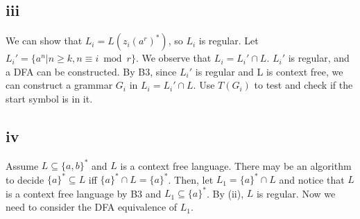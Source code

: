 \documentclass[12pt]{article}
\begin{document}
\subsection*{iii}

We can show that $L_i=L(z_i(a^r)^*)$, so $L_i$ is regular. Let $L_i'=\{a^n|n \ge k, n \equiv i \bmod r\}$. We observe that $L_i=L_i' \cap L$.  $L_i'$ is regular, and a DFA can be constructed. By B3, since $L_i'$ is regular and L is context free, we can construct a grammar $G_i$ in $L_i=L_i' \cap L$. Use $T(G_i)$ to test and check if the start symbol is in it. 

\subsection*{iv}
Assume $L \subseteq \{a,b\}^*$ and $L$ is a context free language.  There may be an algorithm to decide $\{a\}^* \subseteq L$ iff $\{a\}^* \cap L=\{a\}^*$. Then, let $L_1=\{a\}^* \cap L$ and notice that $L$ is a context free language by B3 and $L_1 \subseteq \{a\}^*$. By (ii), $L$ is regular. Now we need to consider the DFA equivalence of $L_1$. 
\end{document}

